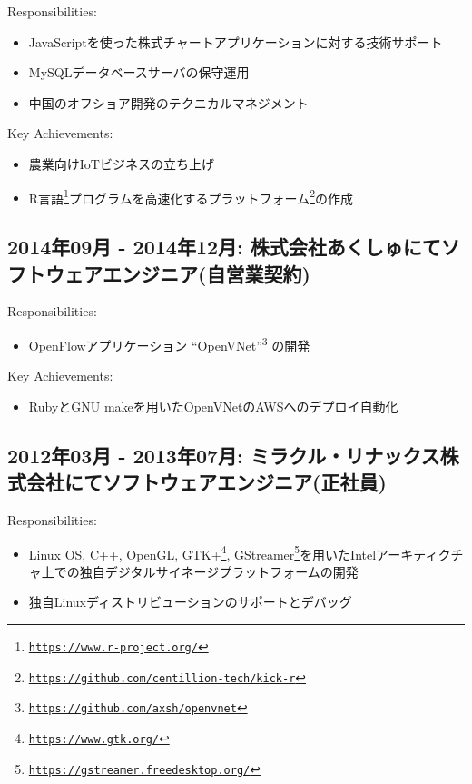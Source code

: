 \documentclass[letterpaper]{article}
\begin{document}
\noindent Responsibilities:

\begin{itemize}
  \item JavaScriptを使った株式チャートアプリケーションに対する技術サポート
  \item MySQLデータベースサーバの保守運用
  \item 中国のオフショア開発のテクニカルマネジメント
\end{itemize}

\noindent Key Achievements:

\begin{itemize}
  \item 農業向けIoTビジネスの立ち上げ
  \item R言語\footnote{\href{https://www.r-project.org/}{\tt https://www.r-project.org/}}プログラムを高速化するプラットフォーム\footnote{\href{https://github.com/centillion-tech/kick-r}{\tt https://github.com/centillion-tech/kick-r}}の作成
\end{itemize}

\subsection*{2014年09月 - 2014年12月: 株式会社あくしゅにてソフトウェアエンジニア(自営業契約)}

\noindent Responsibilities:

\begin{itemize}
  \item OpenFlowアプリケーション ``OpenVNet''\footnote{\href{https://github.com/axsh/openvnet}{\tt https://github.com/axsh/openvnet}} の開発
\end{itemize}

\noindent Key Achievements:

\begin{itemize}
  \item RubyとGNU makeを用いたOpenVNetのAWSへのデプロイ自動化
\end{itemize}

\subsection*{2012年03月 - 2013年07月: ミラクル・リナックス株式会社にてソフトウェアエンジニア(正社員)}

\noindent Responsibilities:

\begin{itemize}
  \item Linux OS, C++, OpenGL, GTK+\footnote{\href{https://www.gtk.org/}{\tt https://www.gtk.org/}}, GStreamer\footnote{\href{https://gstreamer.freedesktop.org/}{\tt https://gstreamer.freedesktop.org/}}を用いたIntelアーキティクチャ上での独自デジタルサイネージプラットフォームの開発
  \item 独自Linuxディストリビューションのサポートとデバッグ
\end{itemize}
\end{document}
